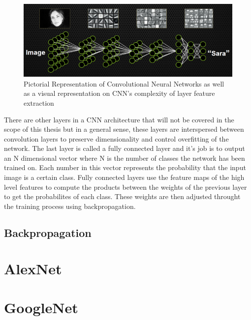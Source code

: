 \begin{figure}[h!]
\centering
\includegraphics[width=.9\linewidth]{figs/facialDetection.png}
\caption{Pictorial Representation of Convolutional Neural Networks as well as a visual representation on CNN's complexity of layer feature extraction}
\label{fig:featuremaps}
\end{figure}
There are other layers in a CNN architecture that will not be covered in the scope of this thesis but in a general sense, these layers are interspersed between convolution layers to preserve dimensionality and control overfitting of the network. The last layer is called a fully connected layer and it's job is to output an N dimensional vector where N is the number of classes the network has been trained on. Each number in this vector represents the probability that the input image is a certain class. Fully connected layers use the feature maps of the high level features to compute the products between the weights of the previous layer to get the probabilites of each class. These weights are then adjusted throught the training process using backpropagation. 
\subsection{Backpropagation}

\section{AlexNet}
\section{GoogleNet}

